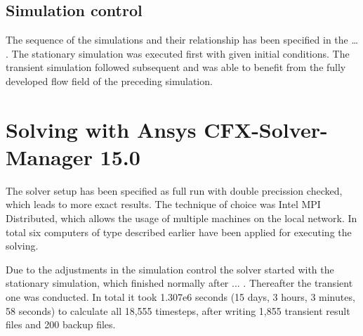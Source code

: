 \subsection{Simulation control}
The sequence of the simulations and their relationship has been specified in the … . The stationary simulation was executed first with given initial conditions. The transient simulation followed subsequent and was able to benefit from the fully developed flow field of the preceding simulation.
\section{Solving with Ansys CFX-Solver-Manager 15.0}
The solver setup has been specified as full run with double precission checked, which leads to more exact results. The technique of choice was Intel MPI Distributed, which allows the usage of multiple machines on the local network. In total six computers of type described earlier have been applied for executing the solving. 

Due to the adjustments in the simulation control the solver started with the stationary simulation, which finished normally after ... . Thereafter the transient one was conducted. In total it took 1.307e6 seconds (15 days, 3 hours, 3 minutes, 58 seconds) to calculate all 18,555 timesteps, after writing 1,855 transient result files and 200 backup files.



